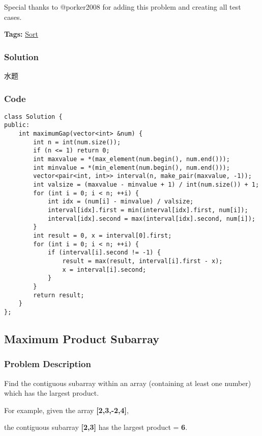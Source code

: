 \documentclass{article}
\begin{document}
\begin{CJK*}{UTF8}{gkai}
Special thanks to @porker2008 for adding this problem and creating all test cases.


\textbf{Tags: }
\hyperref[ Sort ]{ Sort }



\subsubsection*{Solution}
水题

\subsubsection*{Code}
\begin{lstlisting}
class Solution {
public:
    int maximumGap(vector<int> &num) {
        int n = int(num.size());
        if (n <= 1) return 0;
        int maxvalue = *(max_element(num.begin(), num.end()));
        int minvalue = *(min_element(num.begin(), num.end()));
        vector<pair<int, int>> interval(n, make_pair(maxvalue, -1));
        int valsize = (maxvalue - minvalue + 1) / int(num.size()) + 1;
        for (int i = 0; i < n; ++i) {
            int idx = (num[i] - minvalue) / valsize;
            interval[idx].first = min(interval[idx].first, num[i]);
            interval[idx].second = max(interval[idx].second, num[i]);
        }
        int result = 0, x = interval[0].first;
        for (int i = 0; i < n; ++i) {
            if (interval[i].second != -1) {
                result = max(result, interval[i].first - x);
                x = interval[i].second;
            }
        }
        return result;
    }
}; 
\end{lstlisting}


\subsection{ Maximum Product Subarray }
\label{ Maximum Product Subarray }

\subsubsection*{Problem Description}
Find the contiguous subarray within an array (containing at least one number) which has the largest product.

For example, given the array \textbf{[2,3,-2,4]},


the contiguous subarray \textbf{[2,3]} has the largest product = \textbf{6}.



\end{CJK*}
\end{document}
